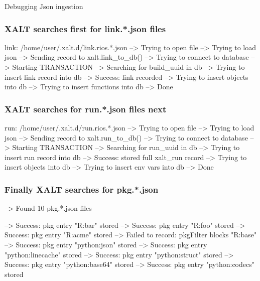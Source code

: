\documentclass{beamer}
\begin{document}
\begin{frame}{Debugging Json ingestion}
\end{frame}

\begin{frame}[fragile]
    \frametitle{XALT searches first for link.*.json files}
 {\tiny
    \begin{semiverbatim}
link: /home/user/.xalt.d/link.rios.*.json
  --> Trying to open file
  --> Trying to load json
  --> Sending record to xalt.link_to_db()
  --> Trying to connect to database
  --> Starting TRANSACTION
  --> Searching for build_uuid in db
  --> Trying to insert link record into db
  --> Success: link recorded
  --> Trying to insert objects into db
  --> Trying to insert functions into db
  --> Done
    \end{semiverbatim}
}
\end{frame}


\begin{frame}[fragile]
    \frametitle{XALT searches for run.*.json files next}
 {\tiny
    \begin{semiverbatim}
run: /home/user/.xalt.d/run.rios.*.json
  --> Trying to open file
  --> Trying to load json
  --> Sending record to xalt.run_to_db()
  --> Trying to connect to database
  --> Starting TRANSACTION
  --> Searching for run_uuid in db
  --> Trying to insert run record into db
  --> Success: stored full xalt_run record
  --> Trying to insert objects into db
  --> Trying to insert env vars into db
  --> Done
    \end{semiverbatim}
}

\end{frame}

\begin{frame}[fragile]
    \frametitle{Finally XALT searches for pkg.*.json}
 {\tiny
    \begin{semiverbatim}
  --> Found 10 pkg.*.json files

  --> Success: pkg entry "R:bar" stored
  --> Success: pkg entry "R:foo" stored
  --> Success: pkg entry "R:acme" stored
  --> Failed to record: pkgFilter blocks "R:base" 
  --> Success: pkg entry "python:json" stored
  --> Success: pkg entry "python:linecache" stored
  --> Success: pkg entry "python:struct" stored
  --> Success: pkg entry "python:base64" stored
  --> Success: pkg entry "python:codecs" stored
    \end{semiverbatim}
}
\end{frame}
\end{document}

